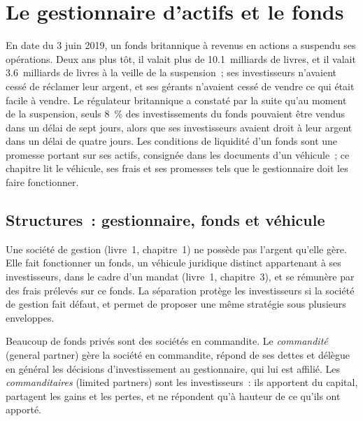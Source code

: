\chapter{Le gestionnaire d'actifs et le fonds}\label{ch:fm:the-asset-manager-and-the-fund}

En date du 3 juin 2019, un fonds britannique à revenus en actions a suspendu ses opérations. Deux ans plus tôt, il valait plus de 10.1~milliards de livres, et il valait 3.6~milliards
de livres à la veille de la suspension~; ses investisseurs n'avaient cessé de réclamer leur argent, et ses gérants n'avaient cessé de vendre ce qui était facile à vendre.
Le régulateur britannique a constaté par la suite qu'au moment de la suspension, seuls 8~\% des investissements du fonds pouvaient être vendus dans un délai de sept jours, alors que ses investisseurs
avaient droit à leur argent dans un délai de quatre jours. Les conditions de liquidité d'un fonds sont une promesse portant sur ses actifs, consignée dans les documents d'un véhicule~; ce
chapitre lit le véhicule, ses frais et ses promesses tels que le gestionnaire doit les faire fonctionner.

\section{Structures~: gestionnaire, fonds et véhicule}

Une société de gestion (livre~1, chapitre~1) ne possède pas l'argent qu'elle gère. Elle fait fonctionner un fonds, un véhicule juridique distinct appartenant à ses investisseurs,
dans le cadre d'un mandat (livre~1, chapitre~3), et se rémunère par des frais prélevés sur ce fonds. La séparation protège les investisseurs si la société de gestion fait défaut, et permet
de proposer une même stratégie sous plusieurs enveloppes.

\begin{definition}\label{def:fm:the-asset-manager-and-the-fund:gp}
Beaucoup de fonds privés sont des sociétés en commandite. Le \emph{commandité} (general partner) gère la société en commandite, répond de ses dettes
et délègue en général les décisions d'investissement au gestionnaire, qui lui est affilié. Les \emph{commanditaires} (limited partners) sont les investisseurs~:
ils apportent du capital, partagent les gains et les pertes, et ne répondent qu'à hauteur de ce qu'ils ont apporté.
\end{definition}

